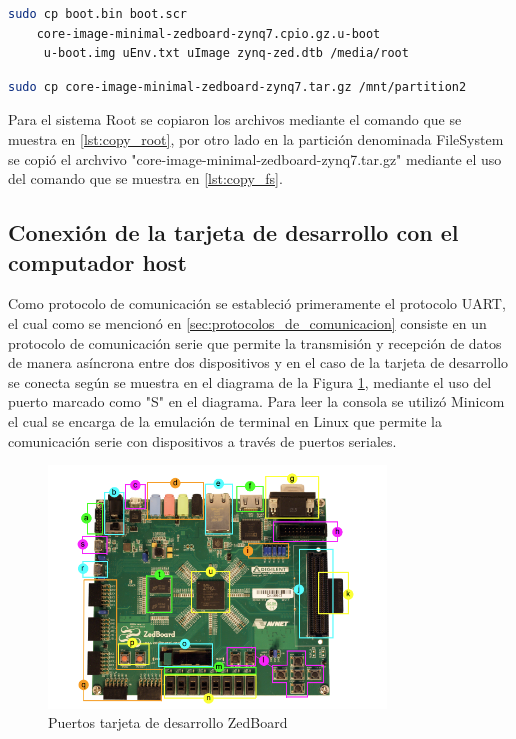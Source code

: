 \begin{lstlisting}[language=bash, caption={Copiar archivos root, Linux}, label=lst:copy_root]
    sudo cp boot.bin boot.scr 
    core-image-minimal-zedboard-zynq7.cpio.gz.u-boot
     u-boot.img uEnv.txt uImage zynq-zed.dtb /media/root
\end{lstlisting}

\begin{lstlisting}[language=bash, caption={Copiar sistema de archivos, Linux}, label=lst:copy_fs]
    sudo cp core-image-minimal-zedboard-zynq7.tar.gz /mnt/partition2
\end{lstlisting}

Para el sistema Root se copiaron los archivos mediante el comando que se muestra en \ref{lst:copy_root}, por otro lado en la partición denominada FileSystem se copió el archvivo "core-image-minimal-zedboard-zynq7.tar.gz" mediante el uso del comando que se muestra en \ref{lst:copy_fs}.

\subsection{Conexión de la tarjeta de desarrollo con el computador host}

Como protocolo de comunicación se estableció primeramente el protocolo UART, el cual como se mencionó en \ref{sec:protocolos_de_comunicacion} consiste en un protocolo de comunicación serie que permite la transmisión y recepción de datos de manera asíncrona entre dos dispositivos y en el caso de la tarjeta de desarrollo se conecta según se muestra en el diagrama de la Figura \ref{fig:puertos_zedboard}, mediante el uso del puerto marcado como "S" en el diagrama. Para  leer la consola se utilizó Minicom el cual se encarga de la emulación de terminal en Linux que permite la comunicación serie con dispositivos a través de puertos seriales.

\begin{figure}[h!]
    \centering
    \includegraphics[width=0.8\textwidth]{fig/teorico/zedboard_raw.png}
    \caption{Puertos tarjeta de desarrollo ZedBoard}
    \label{fig:puertos_zedboard}
\end{figure}


